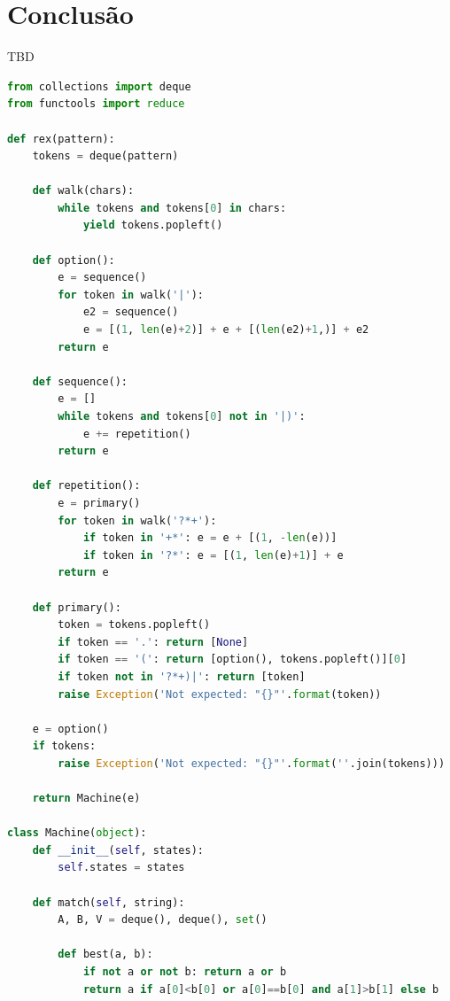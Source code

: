 \documentclass[a4paper,12pt,oneside,onecolumn]{uerj}
\begin{document}
\chapter{Conclusão}

TBD

\backmatter

\appendix

\label{app:full_source}

\begin{lstlisting}[language=python]
from collections import deque
from functools import reduce

def rex(pattern):
    tokens = deque(pattern)

    def walk(chars):
        while tokens and tokens[0] in chars:
            yield tokens.popleft()

    def option():
        e = sequence()
        for token in walk('|'):
            e2 = sequence()
            e = [(1, len(e)+2)] + e + [(len(e2)+1,)] + e2
        return e        

    def sequence():
        e = []
        while tokens and tokens[0] not in '|)':
            e += repetition()
        return e
        
    def repetition():
        e = primary()
        for token in walk('?*+'):
            if token in '+*': e = e + [(1, -len(e))]
            if token in '?*': e = [(1, len(e)+1)] + e
        return e
        
    def primary():
        token = tokens.popleft()
        if token == '.': return [None]
        if token == '(': return [option(), tokens.popleft()][0]
        if token not in '?*+)|': return [token]
        raise Exception('Not expected: "{}"'.format(token))

    e = option()
    if tokens: 
        raise Exception('Not expected: "{}"'.format(''.join(tokens)))

    return Machine(e)
                
class Machine(object):
    def __init__(self, states):
        self.states = states
        
    def match(self, string):
        A, B, V = deque(), deque(), set()
             
        def best(a, b):
            if not a or not b: return a or b
            return a if a[0]<b[0] or a[0]==b[0] and a[1]>b[1] else b
                

\end{lstlisting}
\end{document}
